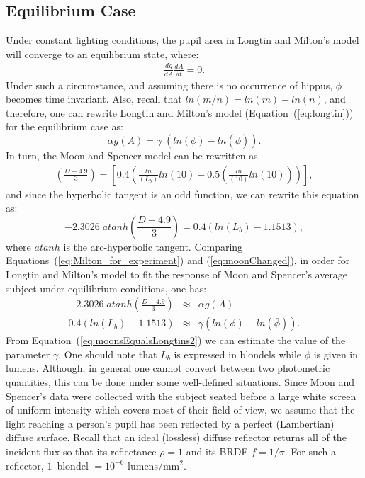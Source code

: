 \documentclass{acmtog} %
\begin{document}
\subsection{Equilibrium Case}
\label{subsec:EquilibriumCase}
Under constant lighting conditions, the pupil area in Longtin and
Milton's model will converge to an equilibrium state, where:
\begin{eqnarray*}
  \frac{dg}{dA}\frac{dA}{dt} = 0.
  \label{eq:longtinArea}
\end{eqnarray*}
%
Under such a circumstance, and assuming there is no occurrence of
hippus, $\phi$ becomes time invariant. Also, recall that
${{ln}}(m/n)={{ln}}(m) - ln(n)$, and therefore, one can rewrite Longtin
and Milton's model (Equation~(\ref{eq:longtin})) for the equilibrium
case as:
\begin{equation}
 \alpha g(A) = \gamma \; ({{ln}}(\phi) - {{ln}}(\bar{\phi})).
 \label{eq:Milton_for_experiment}
\end{equation}
%
In turn, the Moon and Spencer model can be rewritten as
\begin{eqnarray*}
  \left(\frac{D - 4.9}{3} \right) = \left[0.4 \left( \frac{ln}{(L_{b})}ln(10) - 0.5 \left(\frac{ln}{(10)}ln(10)\right)
\right)\right],
  \label{eq:moonAndSpencerRewrote}
\end{eqnarray*}
and since the hyperbolic tangent is an odd function, we can rewrite this equation as:
\begin{equation}
  -2.3026 \; {{atanh}} \left(\frac{D-4.9}{3}\right) = 0.4 ({{ln}}(L_{b}) -1.1513),
\label{eq:moonChanged}
\end{equation}
where ${{atanh}}$ is the arc-hyperbolic tangent. Comparing Equations~(\ref{eq:Milton_for_experiment}) and
(\ref{eq:moonChanged}), in order for  Longtin and Milton's model to fit the response of Moon and Spencer's average
subject under  equilibrium conditions, one has:
\begin{eqnarray}
\label{eq:moonsEqualsLongtins1}
 -2.3026 \; {{atanh}} \left(\frac{D-4.9}{3}\right) & \approx & \alpha g(A) \\
\label{eq:moonsEqualsLongtins2}
 0.4 ( {{ln}}(L_{b}) -1.1513)  & \approx &  \gamma ({{ln}}(\phi) - {{ln}}(\bar{\phi})).
\end{eqnarray}
%
From Equation~(\ref{eq:moonsEqualsLongtins2}) we can estimate the value
of the parameter $\gamma$. One should note that $L_b$ is expressed in
blondels while $\phi$ is given in lumens. Although, in general one
cannot convert between two photometric quantities, this can be done
under some well-defined situations. Since Moon and Spencer's data were
collected with the subject seated before a large white screen of uniform
intensity which covers most of their field of view, we assume that the
light reaching a person's pupil has been reflected by a perfect
(Lambertian) diffuse surface. Recall that an ideal (lossless) diffuse
reflector returns all of the incident flux so that its reflectance $\rho
= 1$ and its BRDF $f = 1/\pi$. For such a reflector, $1$~blondel $=
10^{-6}$ lumens/mm$^2$.
\end{document}
